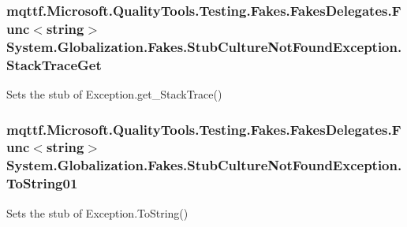 \hypertarget{class_system_1_1_globalization_1_1_fakes_1_1_stub_culture_not_found_exception_a327ee305db51b38fc9d0924e8a16289f}{
\subsubsection[{Stack\-Trace\-Get}]{\setlength{\rightskip}{0pt plus 5cm}mqttf.\-Microsoft.\-Quality\-Tools.\-Testing.\-Fakes.\-Fakes\-Delegates.\-Func$<$string$>$ System.\-Globalization.\-Fakes.\-Stub\-Culture\-Not\-Found\-Exception.\-Stack\-Trace\-Get}}\label{class_system_1_1_globalization_1_1_fakes_1_1_stub_culture_not_found_exception_a327ee305db51b38fc9d0924e8a16289f}


Sets the stub of Exception.\-get\-\_\-\-Stack\-Trace()

\hypertarget{class_system_1_1_globalization_1_1_fakes_1_1_stub_culture_not_found_exception_a6ecc1f8b718353bfa4506812f8a47976}{
\subsubsection[{To\-String01}]{\setlength{\rightskip}{0pt plus 5cm}mqttf.\-Microsoft.\-Quality\-Tools.\-Testing.\-Fakes.\-Fakes\-Delegates.\-Func$<$string$>$ System.\-Globalization.\-Fakes.\-Stub\-Culture\-Not\-Found\-Exception.\-To\-String01}}\label{class_system_1_1_globalization_1_1_fakes_1_1_stub_culture_not_found_exception_a6ecc1f8b718353bfa4506812f8a47976}


Sets the stub of Exception.\-To\-String()



